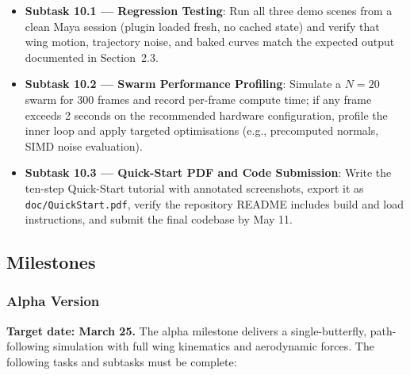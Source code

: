 \documentclass[12pt]{article}
\begin{document}
\begin{itemize}
  \item \textbf{Subtask 10.1 --- Regression Testing}: Run all three demo scenes
    from a clean Maya session (plugin loaded fresh, no cached state) and verify
    that wing motion, trajectory noise, and baked curves match the expected output
    documented in Section~2.3.
  \item \textbf{Subtask 10.2 --- Swarm Performance Profiling}: Simulate a
    $N=20$ swarm for 300 frames and record per-frame compute time; if any frame
    exceeds 2 seconds on the recommended hardware configuration, profile the inner
    loop and apply targeted optimisations (e.g., precomputed normals, SIMD noise
    evaluation).
  \item \textbf{Subtask 10.3 --- Quick-Start PDF and Code Submission}: Write the
    ten-step Quick-Start tutorial with annotated screenshots, export it as
    \texttt{doc/QuickStart.pdf}, verify the repository README includes build and
    load instructions, and submit the final codebase by May 11.
\end{itemize}

\subsection{Milestones}

\subsubsection{Alpha Version}

\textbf{Target date: March 25.} \quad
The alpha milestone delivers a single-butterfly, path-following simulation with
full wing kinematics and aerodynamic forces. The following tasks and subtasks must
be complete:
\end{document}
